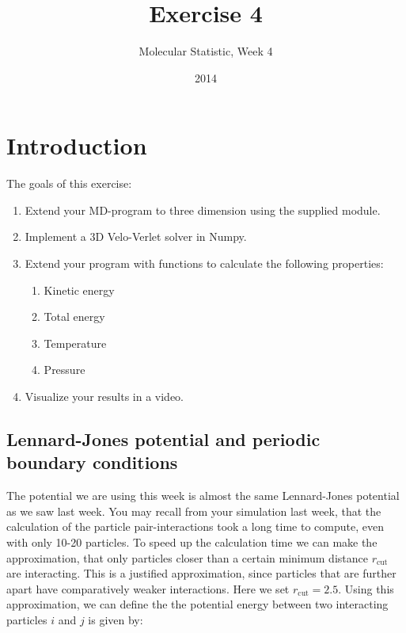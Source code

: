 \documentclass{article}
\title{Exercise 4}
\author{Molecular Statistic, Week 4}
\date{2014}
\begin{document}

\maketitle

\section{Introduction}

The goals of this exercise:
\begin{enumerate}
    \item Extend your MD-program to three dimension using the supplied module.

    \item Implement a 3D Velo-Verlet solver in Numpy.

    \item Extend your program with functions to calculate the following properties:
    \begin{enumerate}
        \item Kinetic energy
        \item Total energy
        \item Temperature
        \item Pressure
    \end{enumerate}

    \item Visualize your results in a video.

\end{enumerate}

\subsection{Lennard-Jones potential and periodic boundary conditions}

The potential we are using this week is almost the same Lennard-Jones potential
as we saw last week.  You may recall from your simulation last week, that the
calculation of the particle pair-interactions took a long time to compute, even
with only 10-20 particles.
To speed up the calculation time we can make the approximation, that only
particles closer than a certain minimum distance $r_{\mathrm{cut}}$ are
interacting.
This is a justified approximation, since particles that are
further apart have comparatively weaker interactions.
Here we set $r_{\mathrm{cut}} = 2.5$.
Using this approximation, we can define the the potential energy between two
interacting particles $i$ and $j$ is given by:
\end{document}
